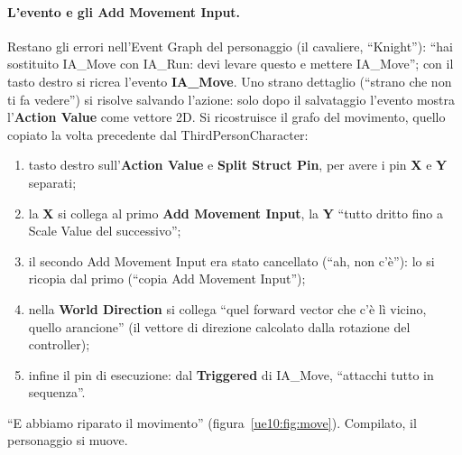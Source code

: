 \paragraph{L'evento e gli Add Movement Input.} Restano gli errori nell'Event Graph del
personaggio (il cavaliere, ``Knight''): ``hai sostituito IA\_Move con IA\_Run: devi levare
questo e mettere IA\_Move''; con il tasto destro si ricrea l'evento \textbf{IA\_Move}.
Uno strano dettaglio (``strano che non ti fa vedere'') si risolve salvando l'azione: solo
dopo il salvataggio l'evento mostra l'\textbf{Action Value} come vettore 2D. Si ricostruisce
il grafo del movimento, quello copiato la volta precedente dal ThirdPersonCharacter:
\begin{enumerate}
  \item tasto destro sull'\textbf{Action Value} e \textbf{Split Struct Pin}, per avere i
        pin \textbf{X} e \textbf{Y} separati;
  \item la \textbf{X} si collega al primo \textbf{Add Movement Input}, la \textbf{Y}
        ``tutto dritto fino a Scale Value del successivo'';
  \item il secondo Add Movement Input era stato cancellato (``ah, non c'è''): lo si
        ricopia dal primo (``copia Add Movement Input'');
  \item nella \textbf{World Direction} si collega ``quel forward vector che c'è lì
        vicino, quello arancione'' (il vettore di direzione calcolato dalla rotazione
        del controller);
  \item infine il pin di esecuzione: dal \textbf{Triggered} di IA\_Move, ``attacchi
        tutto in sequenza''.
\end{enumerate}
``E abbiamo riparato il movimento'' (figura~\ref{ue10:fig:move}). Compilato, il
personaggio si muove.

